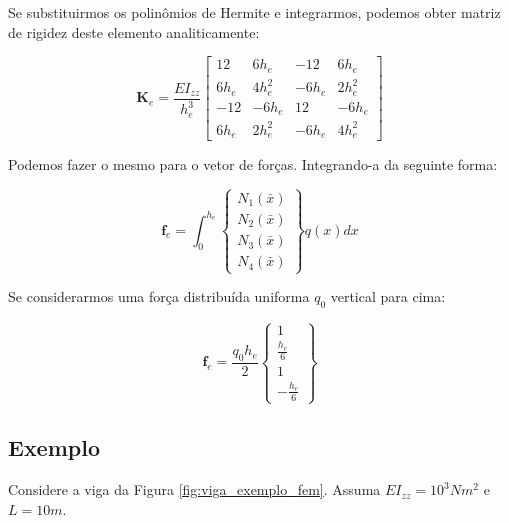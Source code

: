        Se substituirmos os polinômios de Hermite e integrarmos, podemos obter matriz de rigidez deste elemento analiticamente:

        \begin{equation}
            \mathbf{K}_e = 
            \frac{EI_{zz}}{h_e^3}
            \begin{bmatrix}
                12   & 6h_e   & -12   & 6h_e   \\
                6h_e & 4h_e^2 & -6h_e & 2h_e^2 \\
                -12  & -6h_e  & 12    & -6h_e  \\
                6h_e & 2h_e^2 & -6h_e & 4h_e^2
            \end{bmatrix}
        \end{equation}


        Podemos fazer o mesmo para o vetor de forças. Integrando-a da seguinte forma:

        \begin{equation}
            \mathbf{f}_e = 
            \int_0^{h_e} 
            \begin{Bmatrix}
                N_1(\bar{x})\\
                N_2(\bar{x})\\
                N_3(\bar{x})\\
                N_4(\bar{x})
            \end{Bmatrix}
            q(x)
            dx
        \end{equation}

        Se considerarmos uma força distribuída uniforma $q_0$ vertical para cima:

        \begin{equation}
            \mathbf{f}_e = 
            \frac{q_0 h_e}{2}
            \begin{Bmatrix}
                1\\
                \frac{h_e}{6}\\
                1\\
                -\frac{h_e}{6}
            \end{Bmatrix}
        \end{equation}

    \subsection*{Exemplo}

        Considere a viga da Figura \ref{fig:viga_exemplo_fem}. Assuma $EI_{zz} = 10^3 Nm^2$ e $L=10 m$.

